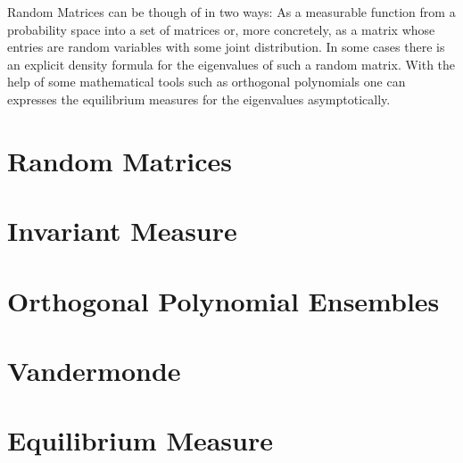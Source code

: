 Random Matrices can be though of in two ways: As a measurable function from a probability space into a set of matrices or, more concretely, as a matrix whose entries are random variables with some joint distribution. In some cases there is an explicit density formula for the eigenvalues of such a random matrix. With the help of some mathematical tools such as orthogonal polynomials one can expresses the equilibrium measures for the eigenvalues asymptotically.

\section{Random Matrices}


\section{Invariant Measure}


\section{Orthogonal Polynomial Ensembles}


\section{Vandermonde}
\label{Vandermonde}


\section{Equilibrium Measure}


